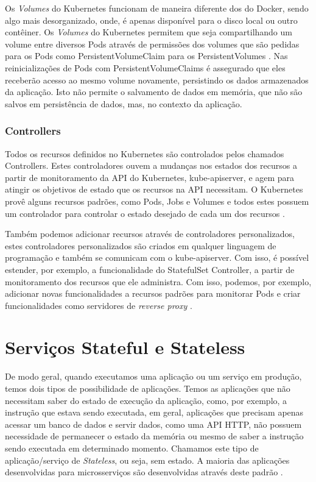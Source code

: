 Os \textit{Volumes} do Kubernetes funcionam de maneira diferente dos do
Docker, sendo algo mais desorganizado, onde, é apenas disponível para o
disco local ou outro contêiner. Os \textit{Volumes} do Kubernetes permitem
que seja compartilhando um volume entre diversos Pods através de permissões
dos volumes que são pedidas para os Pods como PersistentVolumeClaim para os
PersistentVolumes \cite{kubernetes:persistent-volumes}. Nas reinicializações
de Pods com PersistentVolumeClaims é assegurado que eles receberão acesso
ao mesmo volume novamente, persistindo os dados armazenados da aplicação.
Isto não permite o salvamento de dados em memória, que não são salvos em
persistência de dados, mas, no contexto da aplicação.

\subsubsection{Controllers}

Todos os recursos definidos no Kubernetes são controlados pelos chamados
Controllers. Estes controladores ouvem a mudanças nos estados dos recursos
a partir de monitoramento da API do Kubernetes, kube-apiserver, e agem
para atingir os objetivos de estado que os recursos na API necessitam. O
Kubernetes provê alguns recursos padrões, como Pods, Jobs e Volumes e
todos estes possuem um controlador para controlar o estado desejado de
cada um dos recursos \cite{kubernetes:controllers}.

Também podemos adicionar recursos através de controladores personalizados,
estes controladores personalizados são criados em qualquer linguagem de
programação e também se comunicam com o kube-apiserver. Com isso, é
possível estender, por exemplo, a funcionalidade do StatefulSet Controller,
a partir de monitoramento dos recursos que ele administra. Com isso, podemos,
por exemplo, adicionar novas funcionalidades a recursos padrões para
monitorar Pods e criar funcionalidades como servidores de \textit{reverse proxy} \cite{kubernetes:controllers}.

\section{Serviços Stateful e Stateless}

De modo geral, quando executamos uma aplicação ou um serviço em produção,
temos dois tipos de possibilidade de aplicações. Temos as aplicações que
não necessitam saber do estado de execução da aplicação, como, por exemplo,
a instrução que estava sendo executada, em geral, aplicações que precisam
apenas acessar um banco de dados e servir dados, como uma API HTTP, não
possuem necessidade de permanecer o estado da memória ou mesmo de saber a
instrução sendo executada em determinado momento. Chamamos este tipo de
aplicação/serviço de \textit{Stateless}, ou seja, sem estado. A maioria das
aplicações desenvolvidas para microsserviços são desenvolvidas através
deste padrão \cite{vayghan2021kubernetes}.

